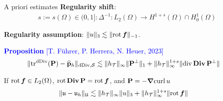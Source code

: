 \documentclass[10pt, compress]{beamer}
\begin{document}
\begin{frame}{A priori estimates}
\textbf{Regularity shift}:
    \begin{align*}
        s := s(\Omega) \in (0,1]: \Delta^{-1}: L_2(\Omega) \to H^{1+s}(\Omega) \cap H^1_0(\Omega)
    \end{align*} 
    
    \textbf{Regularity assumption}: $\|u\|_3 \lesssim \|{\rm rot\,}\boldsymbol{f}\|_{-1}$.
    \vspace{1.5 em}

    \textcolor{blue}{\textbf{Proposition} [T. F\"uhrer, P. Herrera, N. Heuer, 2023]}
    \begin{align*}
              \|\mathrm{tr}_{}^{\mathrm{dDiv}}(\mathbf{P}) - \widehat{\mathbf{p}}_h\|_{\mathrm{dDiv},\mathcal{S}}
   &\lesssim \|h_{\mathcal{T}}\|_\infty \|\mathbf{P}^\perp\|_1 + \|h_{\mathcal{T}}\|_\infty^{1+s} \|{\rm div\,}{\rm\bf Div\,}\mathbf{P}^\perp \|  
    \end{align*}



    
   If ${\rm rot\,} \boldsymbol{f} \in L_2(\Omega)$,  ${\rm rot\,}{\rm\bf Div\,} \mathbf{P} = {\rm rot\,} \boldsymbol{f}$, and  $\mathbf{P}= -\boldsymbol{\nabla}{\rm curl\,} u $ 
   \begin{align*}
   \|\mathfrak{u}-\mathfrak{u}_h\|_{\mathfrak{U}} &\lesssim \|h_{\mathcal{T}}\|_\infty \|u\|_{3} + \|h_{\mathcal{T}}\|_\infty^{1+s} \|{\rm rot\,} \boldsymbol{f} \|
   \end{align*}
\end{frame}
\end{document}
